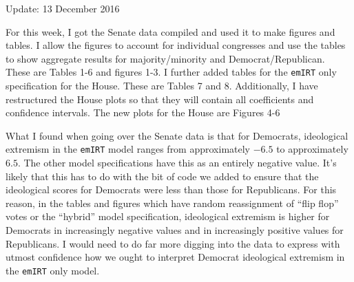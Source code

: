 \documentclass[12pt]{article}
\begin{document}
	
	\begin{center}
		Update: 13 December 2016
	\end{center}

For this week, I got the Senate data compiled and used it to make figures and tables. I allow the figures to account for individual congresses and use the tables to show aggregate results for majority/minority and Democrat/Republican. These are Tables 1-6 and figures 1-3. I further added tables for the \verb|emIRT| only specification for the House. These are Tables 7 and 8. Additionally, I have restructured the House plots so that they will contain all coefficients and confidence intervals. The new plots for the House are Figures 4-6

What I found when going over the Senate data is that for Democrats, ideological extremism in the \verb|emIRT| model ranges from approximately $-6.5$ to approximately $6.5$. The other model specifications have this as an entirely negative value. It's likely that this has to do with the bit of code we added to ensure that the ideological scores for Democrats were less than those for Republicans. For this reason, in the tables and figures which have random reassignment of ``flip flop'' votes or the ``hybrid'' model specification, ideological extremism is higher for Democrats in increasingly negative values and in increasingly positive values for Republicans. I would need to do far more digging into the data to express with utmost confidence how we ought to interpret Democrat ideological extremism in the \verb|emIRT| only model.
\end{document}
